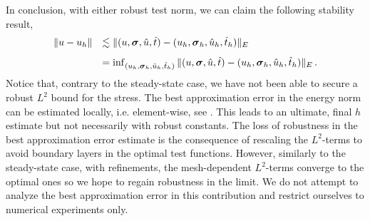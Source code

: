 \documentclass[Dissertation.tex]{subfiles}
\begin{document}
In conclusion, with either robust test norm, we can claim the following stability result,
$$
\begin{array}{ll}
\Vert u - u_h \Vert & \lesssim \Vert (u,\boldsymbol\sigma,\hat{u},\hat{t}) - (u_h,\boldsymbol\sigma_h,\hat{u}_h,\hat{t}_h) \Vert_E \\[8pt]
& = \inf_{(u_h,\boldsymbol\sigma_h,\hat{u}_h,\hat{t}_h)} \Vert (u,\boldsymbol\sigma,\hat{u},\hat{t}) - (u_h,\boldsymbol\sigma_h,\hat{u}_h,\hat{t}_h) \Vert_E \, .
\end{array}
$$
Notice that, contrary to the steady-state case, we have not been able to secure a robust $L^2$ bound
for the stress. The best approximation error in the energy norm can be estimated locally, i.e.
element-wise, see \cite{DemkowiczHeuer,ChanHeuerThanhDemkowicz2012}. This leads to an ultimate, final $h$ estimate but
not necessarily with robust constants. The loss of robustness in the best approximation error
estimate is the consequence of rescaling the $L^2$-terms to avoid boundary layers in the optimal
test functions. However, similarly to the steady-state case, with refinements, the mesh-dependent
$L^2$-terms converge to the optimal ones so we hope to regain robustness in the limit. 
We do not attempt to analyze the best approximation error in this contribution and restrict
ourselves to numerical experiments only.
\end{document}
